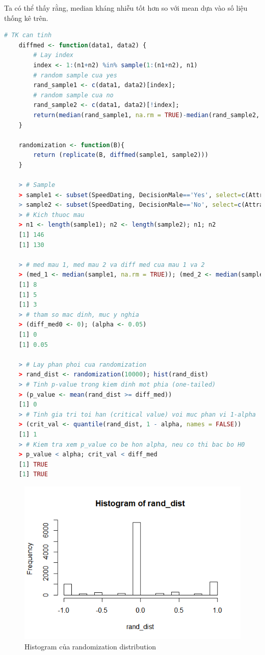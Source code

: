\documentclass[a4paper,12pt]{article}
\begin{document}
	Ta có thể thấy rằng, median kháng nhiễu tốt hơn so với mean dựa vào số liệu thống kê trên.\\
	
	\begin{lstlisting}[language=R]
	# TK can tinh
	diffmed <- function(data1, data2) {
		# Lay index
		index <- 1:(n1+n2) %in% sample(1:(n1+n2), n1)
		# random sample cua yes
		rand_sample1 <- c(data1, data2)[index];
		# random sample cua no
		rand_sample2 <- c(data1, data2)[!index];
		return(median(rand_sample1, na.rm = TRUE)-median(rand_sample2, na.rm = TRUE))
	}
	
	randomization <- function(B){
		return (replicate(B, diffmed(sample1, sample2)))
	}
	
	> # Sample
	> sample1 <- subset(SpeedDating, DecisionMale=='Yes', select=c(AttractiveM))[[1]]; 
	> sample2 <- subset(SpeedDating, DecisionMale=='No', select=c(AttractiveM))[[1]];
	> # Kich thuoc mau
	> n1 <- length(sample1); n2 <- length(sample2); n1; n2
	[1] 146
	[1] 130
	
	> # med mau 1, med mau 2 va diff med cua mau 1 va 2
	> (med_1 <- median(sample1, na.rm = TRUE)); (med_2 <- median(sample2, na.rm = TRUE)); (diff_med <- med_1 - med_2)
	[1] 8
	[1] 5
	[1] 3
	> # tham so mac dinh, muc y nghia
	> (diff_med0 <- 0); (alpha <- 0.05)
	[1] 0
	[1] 0.05
	
	> # Lay phan phoi cua randomization
	> rand_dist <- randomization(10000); hist(rand_dist)
	> # Tinh p-value trong kiem dinh mot phia (one-tailed)
	> (p_value <- mean(rand_dist >= diff_med))
	[1] 0
	> # Tinh gia tri toi han (critical value) voi muc phan vi 1-alpha
	> (crit_val <- quantile(rand_dist, 1 - alpha, names = FALSE))
	[1] 1
	> # Kiem tra xem p_value co be hon alpha, neu co thi bac bo H0
	> p_value < alpha; crit_val < diff_med
	[1] TRUE
	[1] TRUE
	\end{lstlisting}
	
	\begin{figure}[H]
		\centering
		\includegraphics[width=0.7\linewidth]{hist}
		\caption{Histogram của randomization distribution}
		\label{fig:hist}
	\end{figure}
	
\end{document}

